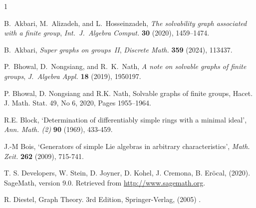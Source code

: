 \documentclass[11pt]{amsart}
\theoremstyle{plain}
\begin{document}


\begin{thebibliography}{1} 



 B.~Akbari, M.~Alizadeh, and L.~Hosseinzadeh, \textit{The solvability graph associated with a finite group}, \emph{Int.\ J.\ Algebra Comput.} \textbf{30} (2020), 1459–1474.

 B.~Akbari, \textit{Super graphs on groups~II}, \emph{Discrete Math.} \textbf{359} (2024), 113437.

 P.~Bhowal, D.~Nongsiang, and R.~K.~Nath, \textit{A note on solvable graphs of finite groups}, \emph{J.\ Algebra Appl.} \textbf{18} (2019), 1950197.

 P. Bhowal, D. Nongsiang and R.K. Nath, Solvable graphs of finite groups, Hacet. J. Math. Stat. 49, No 6, 2020, Pages 1955–1964.

  R.E. Block, `Determination of differentiably simple rings with a minimal ideal', {\it Ann. Math. (2)} {\bf 90} (1969), 433-459.

 J.-M Bois, `Generators of simple Lie algebras in arbitrary characteristics', {\it Math. Zeit.} {\bf 262} (2009), 715-741.


	T. S. Developers, W. Stein, D. Joyner, D. Kohel, J. Cremona, B. Eröcal,  (2020). SageMath, version 9.0. Retrieved from \url{http://www.sagemath.org}.

 R. Diestel,  Graph Theory. 3rd Edition, Springer-Verlag, (2005) . 


\end{thebibliography}
\end{document}
